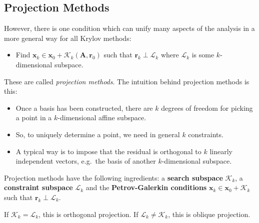 \documentclass[12pt,a4paper]{article} %
\begin{document}
\subsection{Projection Methods}
However, there is one condition which can unify many aspects of the analysis in 
a more general way for all Krylov methods:
\begin{itemize}
    \item Find $\bm x_k \in  \bm x_0 + \mathcal K_k(\mathbf A, \bm r_0)$ such that 
    $\bm r_k \perp \mathcal L_k$ where $\mathcal L_k$ is some $k$-dimensional subspace.
\end{itemize}
These are called \textit{projection methods}. The intuition behind projection 
methods is this:
\begin{itemize}
    \item Once a basis has been constructed, there are $k$ degrees of freedom
    for picking a point in a $k$-dimensional affine subspace.
    \item So, to uniquely determine a point, we need in general $k$ constraints.
    \item A typical way is to impose that the residual is orthogonal to $k$
    linearly independent vectors, e.g.\ the basis of another $k$-dimensional
    subspace.
\end{itemize}
Projection methods have the following ingredients: a \textbf{search subspace} 
$\mathcal K_k$, a \textbf{constraint subspace} $\mathcal L_k$ and the 
\textbf{Petrov-Galerkin conditions} $\bm x_k \in  \bm x_0 + \mathcal K_k$
such that $\bm r_k \perp \mathcal L_k$.

If $\mathcal K_k = \mathcal L_k$, this is orthogonal projection. If $\mathcal L_k \ne \mathcal K_k$, 
this is oblique projection.
\end{document}

